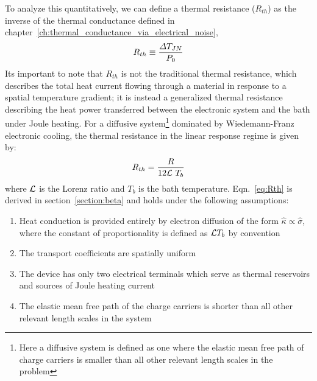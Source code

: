 To analyze this quantitatively, we can define a thermal resistance ($R_{th}$) as the inverse of the thermal conductance defined in chapter~\ref{ch:thermal_conductance_via_electrical_noise},
\begin{equation}
R_{th} \equiv \frac{\Delta T_{JN}}{P_0}
\end{equation}
Its important to note that $R_{th}$ is not the traditional thermal resistance, which describes the total
heat current flowing through a material in response to a spatial temperature gradient; it is instead
a generalized thermal resistance describing the heat power transferred between the electronic
system and the bath under Joule heating. For a diffusive system\footnote{Here a diffusive system is defined as one where the elastic mean free path of charge carriers is smaller than all other relevant length scales in the problem} dominated by Wiedemann-Franz electronic cooling, the thermal resistance in the linear response regime is given by:
\begin{equation}\label{eq:Rth}
R_{th} = \frac{R}{12\mathcal{L}~T_b}
\end{equation}
where $\mathcal{L}$ is the Lorenz ratio and $T_b$ is the bath temperature. Eqn.~\ref{eq:Rth} is derived in section~\ref{section:beta} and holds under the following assumptions:
\begin{enumerate}
\item Heat conduction is provided entirely by electron diffusion of the form $\hat\kappa \propto \hat\sigma$, where the constant of proportionality is defined as $\mathcal{L} T_b$ by convention
\item The transport coefficients are spatially uniform
\item The device has only two electrical terminals which serve as thermal reservoirs and sources of Joule heating current
\item The elastic mean free path of the charge carriers is shorter than all other relevant length scales in the system
\end{enumerate}
